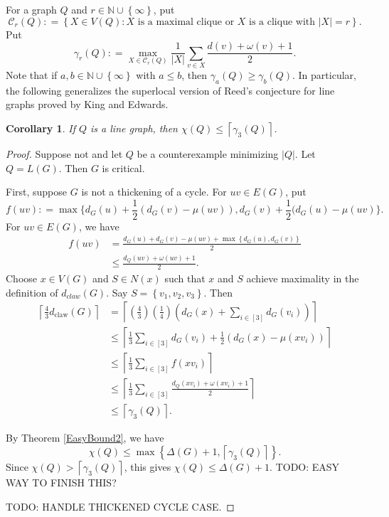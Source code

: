 \documentclass[12pt]{amsart}
\theoremstyle{plain}
\newtheorem{cor}[thm]{Corollary}
\theoremstyle{definition}
\theoremstyle{remark}
\newcommand{\fancy}[1]{\mathcal{#1}}
\newcommand{\C}{\fancy{C}}
\newcommand{\IN}{\mathbb{N}}
\newcommand{\set}[1]{\left\{ #1 \right\}}
\newcommand{\setb}[3]{\left\{ #1 \in #2 : #3 \right\}}
\newcommand{\card}[1]{\left|#1\right|}
\newcommand{\ceil}[1]{\left\lceil#1\right\rceil}
\newcommand{\irange}[1]{\left[#1\right]}
\newcommand{\parens}[1]{\left( #1 \right)}
\newcommand{\DefinedAs}{\mathrel{\mathop:}=}
\newcommand{\dclaw}[1]{d_{\text{claw}}\left( #1 \right)}
\begin{document}
For a graph $Q$ and $r \in \IN \cup \set{\infty}$, put 
\[\C_r(Q) \DefinedAs \setb{X}{V(Q)}{X \text{ is a maximal clique or } X \text { is a clique with } \card{X} = r}.\]
Put
\[\gamma_r(Q) \DefinedAs \max_{X \in \C_r(Q)} \frac{1}{|X|}\sum_{v \in X} \frac{d(v) + \omega(v) + 1}{2}.\]
Note that if $a, b \in \IN \cup \set{\infty}$ with $a \le b$, then $\gamma_a(Q) \ge \gamma_b(Q)$.  In particular, the following generalizes the superlocal version of Reed's conjecture for line graphs
proved by King and Edwards.

\begin{cor}\label{SuperDuperLocalReed}
If $Q$ is a line graph, then $\chi(Q) \le \ceil{\gamma_3(Q)}$.
\end{cor}
\begin{proof}
Suppose not and let $Q$ be a counterexample minimizing $\card{Q}$. Let $Q = L(G)$.  Then $G$ is critical.

First, suppose $G$ is not a thickening of a cycle. For $uv\in E(G)$, put 
\[f(uv) \DefinedAs \max\{d_G(u)+\frac12(d_G(v)-\mu(uv)),d_G(v)+\frac12(d_G(u)-\mu(uv)\}.\]
For $uv \in E(G)$, we have
\begin{align*}
f(uv) &= \frac{d_G(u) + d_G(v) - \mu(uv) + \max\set{d_G(u), d_G(v)}}{2}\\
&\le \frac{d_Q(uv) + \omega(uv) + 1}{2}.
\end{align*}
Choose $x\in V(G)$ and $S\in N(x)$ such that $x$ and $S$ achieve maximality in the definition of $d_{claw}(G)$.  Say
$S = \set{v_1, v_2, v_3}$.  Then
\begin{align*}
\ceil{\frac43\dclaw{G}} &= \ceil{\parens{\frac43}\parens{\frac14}\parens{d_G(x)+\sum_{i \in \irange{3}} d_G(v_i)}} \\
&\le \ceil{\frac13\sum_{i \in \irange{3}} d_G(v_i) + \frac12(d_G(x) - \mu(xv_i))}\\
&\le \ceil{\frac13\sum_{i \in \irange{3}} f(xv_i)}\\
&\le \ceil{\frac13\sum_{i \in \irange{3}} \frac{d_Q(xv_i) + \omega(xv_i) + 1}{2}}\\
&\le \ceil{\gamma_3(Q)}.
\end{align*}

By Theorem \ref{EasyBound2}, we have
\[\chi(Q) \le \max\set{\Delta(G) + 1, \ceil{\gamma_3(Q)}}.\]
Since $\chi(Q) > \ceil{\gamma_3(Q)}$, this gives $\chi(Q) \le \Delta(G) + 1$.  TODO: EASY WAY TO FINISH THIS?

TODO: HANDLE THICKENED CYCLE CASE.
\end{proof}
\end{document}
